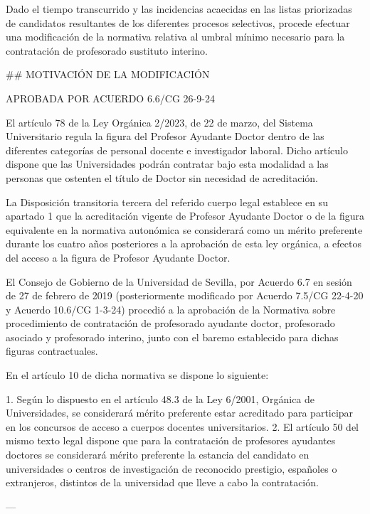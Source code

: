 \documentclass{article}
\begin{document}
\begin{itemize}
\begin{itemize}
\begin{scriptsize}
                  Dado el tiempo transcurrido y las incidencias acaecidas en las listas priorizadas de candidatos resultantes de los diferentes procesos selectivos, procede efectuar una modificación de la normativa relativa al umbral mínimo necesario para la contratación de profesorado sustituto interino.

                  \#\# MOTIVACIÓN DE LA MODIFICACIÓN

                  APROBADA POR ACUERDO 6.6/CG 26-9-24

                  El artículo 78 de la Ley Orgánica 2/2023, de 22 de marzo, del Sistema Universitario regula la figura del Profesor Ayudante Doctor dentro de las diferentes categorías de personal docente e investigador laboral. Dicho artículo dispone que las Universidades podrán contratar bajo esta modalidad a las personas que ostenten el título de Doctor sin necesidad de acreditación.

                  La Disposición transitoria tercera del referido cuerpo legal establece en su apartado 1 que la acreditación vigente de Profesor Ayudante Doctor o de la figura equivalente en la normativa autonómica se considerará como un mérito preferente durante los cuatro años posteriores a la aprobación de esta ley orgánica, a efectos del acceso a la figura de Profesor Ayudante Doctor.

                  El Consejo de Gobierno de la Universidad de Sevilla, por Acuerdo 6.7 en sesión de 27 de febrero de 2019 (posteriormente modificado por Acuerdo 7.5/CG 22-4-20 y Acuerdo 10.6/CG 1-3-24) procedió a la aprobación de la Normativa sobre procedimiento de contratación de profesorado ayudante doctor, profesorado asociado y profesorado interino, junto con el baremo establecido para dichas figuras contractuales.

                  En el artículo 10 de dicha normativa se dispone lo siguiente:

                  1. Según lo dispuesto en el artículo 48.3 de la Ley 6/2001, Orgánica de Universidades, se considerará mérito preferente estar acreditado para participar en los concursos de acceso a cuerpos docentes universitarios.
                  2. El artículo 50 del mismo texto legal dispone que para la contratación de profesores ayudantes doctores se considerará mérito preferente la estancia del candidato en universidades o centros de investigación de reconocido prestigio, españoles o extranjeros, distintos de la universidad que lleve a cabo la contratación.

                  ---


\end{scriptsize}
\end{itemize}
\end{itemize}
\end{document}
